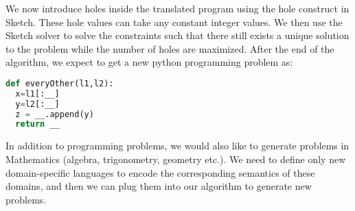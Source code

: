 We now introduce holes inside the translated program using the hole construct in Sketch. These hole values can take any constant integer values. We then use the Sketch solver to solve the constraints such that there still exists a unique solution to the problem while the number of holes are maximized. After the end of the algorithm, we expect to get a new python programming problem as:

\singlespace
\begin{lstlisting}[language=Python, frame=single]
def everyOther(l1,l2):
  x=l1[:__]
  y=l2[:__]
  z = __.append(y)
  return __
\end{lstlisting}
\doublespace

In addition to programming problems, we would also like to generate
problems in Mathematics (algebra, trigonometry, geometry etc.). We
need to define only new domain-specific languages to encode the corresponding semantics of these domains, and then we can plug them into our algorithm to generate new problems.
